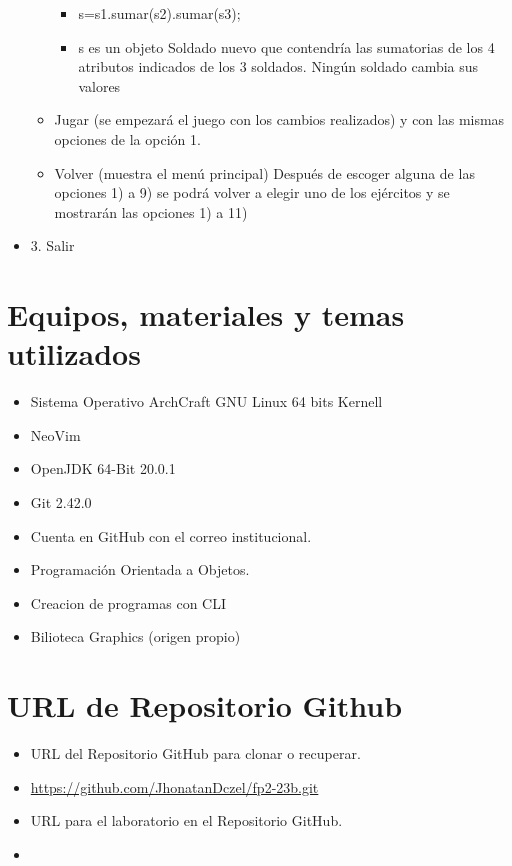\begin{itemize}
\begin{itemize}
\begin{itemize}
              \item s=s1.sumar(s2).sumar(s3);
              \item s es un objeto Soldado nuevo que contendría las
sumatorias de los 4 atributos indicados de los 3 soldados.
Ningún soldado cambia sus valores
            \end{itemize}
          \item Jugar (se empezará el juego con los cambios realizados) y con
las mismas opciones de la opción 1.
          \item Volver (muestra el menú principal)
Después de escoger alguna de las opciones 1) a 9) se podrá volver a
elegir uno de los ejércitos y se mostrarán las opciones 1) a 11)
        \end{itemize} 
        \item 3. Salir
	\end{itemize}
		
	\section{Equipos, materiales y temas utilizados}
	\begin{itemize}
		\item Sistema Operativo ArchCraft GNU Linux 64 bits Kernell
		\item NeoVim
		\item OpenJDK 64-Bit 20.0.1 
		\item Git 2.42.0
		\item Cuenta en GitHub con el correo institucional.
		\item Programación Orientada a Objetos.
		\item Creacion de programas con CLI	
            \item Bilioteca Graphics (origen propio)
	\end{itemize}
	\section{URL de Repositorio Github}
	\begin{itemize}
            \item URL del Repositorio GitHub para clonar o recuperar.
            \item \url{https://github.com/JhonatanDczel/fp2-23b.git}
            \item URL para el laboratorio \itemPracticeNumber{} en el Repositorio GitHub.
            \item \itemUrl
	\end{itemize}
